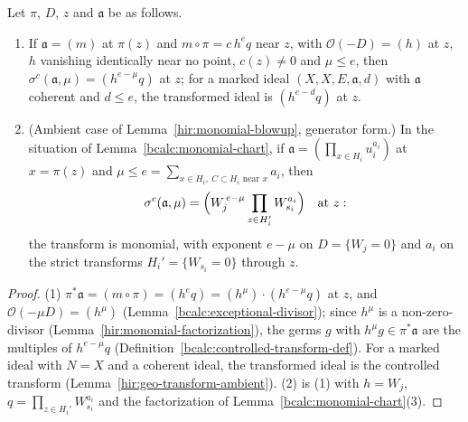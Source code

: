 \begin{theorem}
\label{bcalc:monomial-transform}
\upstreamleanok
Let \(\pi\), \(D\), \(z\) and \(\mathfrak a\) be as follows.
\begin{enumerate}
\item If \(\mathfrak a=(m)\) at \(\pi(z)\) and \(m\circ\pi=c\,h^{e}q\) near \(z\), with \(\mathcal O(-D)=(h)\) at \(z\), \(h\) vanishing identically near no point,
\(c(z)\ne0\) and \(\mu\le e\), then \(\sigma^c(\mathfrak a,\mu)=(h^{e-\mu}q)\) at \(z\); for a marked ideal \((X,X,E,\mathfrak a,d)\) with \(\mathfrak a\) coherent and
\(d\le e\), the transformed ideal is \((h^{e-d}q)\) at \(z\).
\item (Ambient case of Lemma~\ref{hir:monomial-blowup}, generator form.) In the situation of Lemma~\ref{bcalc:monomial-chart}, if
\(\mathfrak a=(\prod_{x\in H_i}u_i^{a_i})\) at \(x=\pi(z)\) and \(\mu\le e=\sum_{x\in H_i,\ C\subset H_i\text{ near }x}a_i\), then
\[
 \sigma^c(\mathfrak a,\mu)=\Bigl(W_j^{\,e-\mu}\prod_{z\in H_i'}W_{s_i}^{a_i}\Bigr)\quad\text{at }z :
\]
the transform is monomial, with exponent \(e-\mu\) on \(D=\{W_j=0\}\) and \(a_i\) on the strict transforms \(H_i'=\{W_{s_i}=0\}\) through \(z\).
\end{enumerate}
\end{theorem}
\begin{proof}
\upstreamleanok
(1) \(\pi^*\mathfrak a=(m\circ\pi)=(h^{e}q)=(h^{\mu})\cdot(h^{e-\mu}q)\) at \(z\), and \(\mathcal O(-\mu D)=(h^{\mu})\) (Lemma~\ref{bcalc:exceptional-divisor});
since \(h^{\mu}\) is a non-zero-divisor (Lemma~\ref{hir:monomial-factorization}), the germs \(g\) with \(h^{\mu}g\in\pi^*\mathfrak a\) are the multiples of
\(h^{e-\mu}q\) (Definition~\ref{bcalc:controlled-transform-def}). For a marked ideal with \(N=X\) and a coherent ideal, the transformed ideal is the controlled
transform (Lemma~\ref{hir:geo-transform-ambient}). (2) is (1) with \(h=W_j\), \(q=\prod_{z\in H_i'}W_{s_i}^{a_i}\) and the factorization of
Lemma~\ref{bcalc:monomial-chart}(3).
\end{proof}

